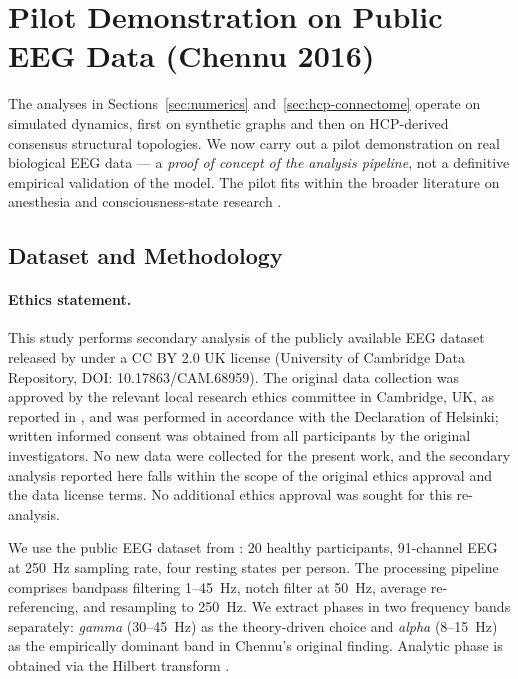 \documentclass[11pt,a4paper]{article}
\theoremstyle{plain}
\theoremstyle{definition}
\theoremstyle{remark}
\begin{document}
\section{Pilot Demonstration on Public EEG Data (Chennu 2016)}
\label{sec:pilot}

The analyses in Sections~\ref{sec:numerics} and~\ref{sec:hcp-connectome} operate on simulated dynamics, first on synthetic graphs and then on HCP-derived consensus structural topologies. We now carry out a pilot demonstration on real biological EEG data --- a \emph{proof of concept of the analysis pipeline}, not a definitive empirical validation of the model. The pilot fits within the broader literature on anesthesia and consciousness-state research \citep{alkire2008,sarasso2015,bola2017}.

\subsection{Dataset and Methodology}

\paragraph{Ethics statement.} This study performs secondary analysis of the publicly available EEG dataset released by \citet{chennu2016} under a CC BY 2.0 UK license (University of Cambridge Data Repository, DOI: 10.17863/CAM.68959). The original data collection was approved by the relevant local research ethics committee in Cambridge, UK, as reported in \citet{chennu2016}, and was performed in accordance with the Declaration of Helsinki; written informed consent was obtained from all participants by the original investigators. No new data were collected for the present work, and the secondary analysis reported here falls within the scope of the original ethics approval and the data license terms. No additional ethics approval was sought for this re-analysis.

We use the public EEG dataset from \citet{chennu2016}: 20 healthy participants, 91-channel EEG at 250~Hz sampling rate, four resting states per person. The processing pipeline comprises bandpass filtering 1--45~Hz, notch filter at 50~Hz, average re-referencing, and resampling to 250~Hz. We extract phases in two frequency bands separately: \emph{gamma} (30--45~Hz) as the theory-driven choice and \emph{alpha} (8--15~Hz) as the empirically dominant band in Chennu's original finding. Analytic phase is obtained via the Hilbert transform \citep{lachaux1999,stam2005}.
\end{document}
